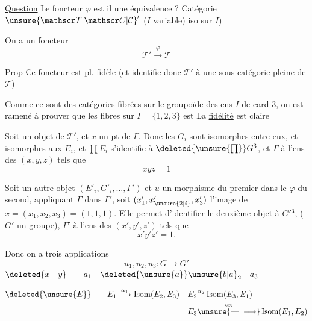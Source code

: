 \uline{Question} Le foncteur $\varphi$ est il une équivalence ?
Catégorie $\unsure{\mathscr T|\mathscr C|\mathcal C}'$ ($I$ variable)  iso sur $I$)

On a un foncteur
\[
\mathscr T'\xrightarrow{\varphi}\mathscr T
\]

\uline{Prop} Ce foncteur est pl. fidèle (et identifie donc  $\mathscr T'$ à une sous-catégorie pleine de $\mathscr T$)

Comme ce sont des catégories fibrées sur le groupoïde des ens $I$ de card $3$, on est ramené à prouver que  les fibres sur $I=\{1,2,3\}$  est   La \uline{fidélité} est claire

Soit  un objet de $\mathscr T'$, et $x$  un pt de $\Gamma$. Donc les $G_i$ sont isomorphes entre eux,  et isomorphes aux $E_i$, et $\prod E_i$ s'identifie à $\deleted{\unsure{\prod}}G^3$, et $\Gamma$ à l'ens des $(x,y,z)$ tels que
\[
xyz=1
\]

Soit un autre objet  $(E'_i,G'_i,\ldots,\Gamma')$ et $u$ un morphisme du  premier dans le $\varphi$ du second, appliquant $\Gamma$ dans $\Gamma'$, soit $(x'_1,x'_{\unsure{2|i}},x'_3)$ l'image de $x=(x_1,x_2,x_3)=(1,1,1)$. Elle permet d'identifier le deuxième objet à $G'{}^3$, ($G'$ un groupe), $\Gamma'$ à l'ens des $(x',y',z')$ tels que
\[
x'y'z'=1 .
\]

Donc on a trois applications
\[
u_1,u_2,u_3\colon G\longrightarrow G'
\]
$\deleted{x\quad y}\qquad a_1\quad \deleted{\unsure{a}}\unsure{b|a}_2\quad a_3$

\[
\begin{aligned}
\deleted{\unsure{E}} \qquad E_1&\xrightarrow{\alpha_1}\operatorname{Isom}(E_2,E_3)&
E_2&\overset{\alpha_2}{\text{---}}\operatorname{Isom}(E_3,E_1)\\
&&E_3&\overset{\alpha_3}{\unsure{\text{---}|\longrightarrow}}\operatorname{Isom}(E_1,E_2)
\end{aligned}
\]



